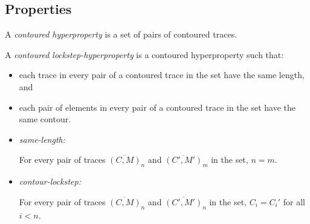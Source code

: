 \documentclass[conference]{IEEEtran}
\begin{document}

\iftext{}\fi

\subsection{Properties}



A {\em contoured hyperproperty} is a set of pairs of contoured
traces.

A {\em contoured lockstep-hyperproperty} is a contoured hyperproperty
such that:

\begin{itemize}
\item each trace in every pair of a contoured trace in the set have the
  same length, and
\item each pair of elements in every pair of a contoured trace in the
  set have the same contour.
\end{itemize}

\begin{itemize}
\item {\em same-length:}

  For every pair of traces $\overline{(C, M)}_n$ and $\overline{(C',
    M')}_m$ in the set, $n = m$.

\item {\em contour-lockstep:}

  For every pair of traces $\overline{(C, M)}_n$ and $\overline{(C',
    M')}_n$ in the set, $C_i = C_i'$ for all $i<n$.
\end{itemize}
\end{document}
